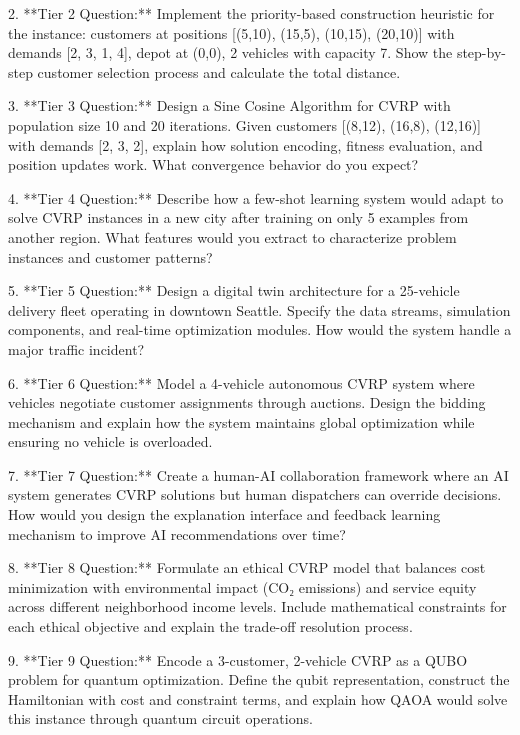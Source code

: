 \documentclass{article}
\begin{document}
2. **Tier 2 Question:** Implement the priority-based construction heuristic for the instance: customers at positions [(5,10), (15,5), (10,15), (20,10)] with demands [2, 3, 1, 4], depot at (0,0), 2 vehicles with capacity 7. Show the step-by-step customer selection process and calculate the total distance.

3. **Tier 3 Question:** Design a Sine Cosine Algorithm for CVRP with population size 10 and 20 iterations. Given customers [(8,12), (16,8), (12,16)] with demands [2, 3, 2], explain how solution encoding, fitness evaluation, and position updates work. What convergence behavior do you expect?

4. **Tier 4 Question:** Describe how a few-shot learning system would adapt to solve CVRP instances in a new city after training on only 5 examples from another region. What features would you extract to characterize problem instances and customer patterns?

5. **Tier 5 Question:** Design a digital twin architecture for a 25-vehicle delivery fleet operating in downtown Seattle. Specify the data streams, simulation components, and real-time optimization modules. How would the system handle a major traffic incident?

6. **Tier 6 Question:** Model a 4-vehicle autonomous CVRP system where vehicles negotiate customer assignments through auctions. Design the bidding mechanism and explain how the system maintains global optimization while ensuring no vehicle is overloaded.

7. **Tier 7 Question:** Create a human-AI collaboration framework where an AI system generates CVRP solutions but human dispatchers can override decisions. How would you design the explanation interface and feedback learning mechanism to improve AI recommendations over time?

8. **Tier 8 Question:** Formulate an ethical CVRP model that balances cost minimization with environmental impact (CO₂ emissions) and service equity across different neighborhood income levels. Include mathematical constraints for each ethical objective and explain the trade-off resolution process.

9. **Tier 9 Question:** Encode a 3-customer, 2-vehicle CVRP as a QUBO problem for quantum optimization. Define the qubit representation, construct the Hamiltonian with cost and constraint terms, and explain how QAOA would solve this instance through quantum circuit operations.
\end{document}
